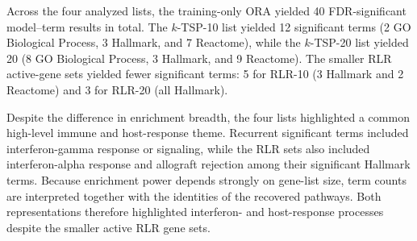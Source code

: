 \documentclass[11pt, a4paper]{article}
\begin{document}
Across the four analyzed lists, the training-only ORA yielded 40 FDR-significant model--term results in total. The $k$-TSP-10 list yielded 12 significant terms (2 GO Biological Process, 3 Hallmark, and 7 Reactome), while the $k$-TSP-20 list yielded 20 (8 GO Biological Process, 3 Hallmark, and 9 Reactome). The smaller RLR active-gene sets yielded fewer significant terms: 5 for RLR-10 (3 Hallmark and 2 Reactome) and 3 for RLR-20 (all Hallmark).

Despite the difference in enrichment breadth, the four lists highlighted a common high-level immune and host-response theme. Recurrent significant terms included interferon-gamma response or signaling, while the RLR sets also included interferon-alpha response and allograft rejection among their significant Hallmark terms. Because enrichment power depends strongly on gene-list size, term counts are interpreted together with the identities of the recovered pathways. Both representations therefore highlighted interferon- and host-response processes despite the smaller active RLR gene sets.
\end{document}
